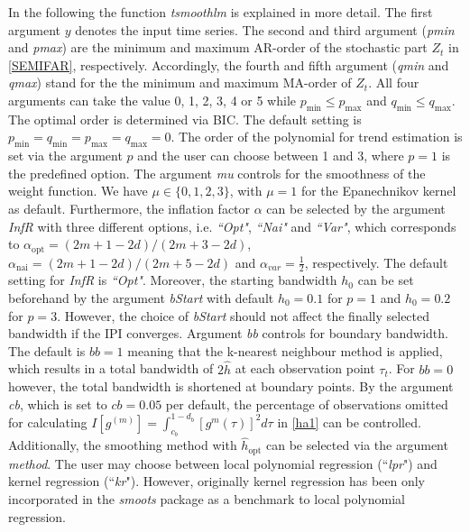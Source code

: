 \documentclass[12pt]{article}
\begin{document}
In the following the function \textit{tsmoothlm} is explained in more detail. The first argument $y$ denotes the input time series. The second and third argument (\textit{pmin} and \textit{pmax}) are the minimum and maximum AR-order of the stochastic part $Z_t$ in \eqref{SEMIFAR}, respectively. Accordingly, the fourth and fifth argument (\textit{qmin} and \textit{qmax}) stand for the the minimum and maximum MA-order of $Z_t$. All four arguments can take the value 0, 1, 2, 3, 4 or 5 while $p_{\text{min}} \leq  p_{\text{max}}$ and $q_{\text{min}} \leq  q_{\text{max}}$. The optimal order is determined via BIC. The default setting is $p_{\text{min}} = q_{\text{min}} = p_{\text{max}} = q_{\text{max}} = 0$. The order of the polynomial for trend estimation is set via the argument $p$ and the user can choose between 1 and 3, where $p = 1$ is the predefined option. The argument \textit{mu} controls for the smoothness of the weight function. We have $\mu \in \{0,1,2,3\}$, with $\mu = 1$ for the Epanechnikov kernel as default. Furthermore, the inflation factor $\alpha$ can be selected by the argument \textit{InfR} with three different options, i.e. \textit{``Opt"}, \textit{``Nai"} and \textit{``Var"}, which corresponds to $\alpha_{\text{opt}} = (2m + 1 - 2d) / (2m + 3 - 2d)$, $\alpha_{\text{nai}} = (2m + 1 - 2d) / (2m + 5 - 2d)$ and $\alpha_{var} = \frac{1}{2}$, respectively. The default setting for \textit{InfR} is \textit{``Opt"}.
Moreover, the starting bandwidth $h_0$ can be set beforehand by the argument \textit{bStart} with default $h_0 = 0.1$ for $p =1$ and $h_0 = 0.2$ for $p = 3$. However, the choice of \textit{bStart} should not affect the finally selected bandwidth if the IPI converges. Argument \textit{bb} controls for boundary bandwidth. The default is $bb = 1$ meaning that the k-nearest neighbour method is applied, which results in a total bandwidth of $2\hat{h}$ at each observation point $\tau_t$. For $\textit{bb} = 0$ however, the total bandwidth is shortened at boundary points. By the argument \textit{cb}, which is set to $\textit{cb} = 0.05$ per default, the percentage of observations omitted for calculating $I[g^{(m)}] = \int_{c_b}^{1-d_b}[g^{m}(\tau)]^2d\tau$ in \eqref{ha1} can be controlled. Additionally, the smoothing method with $\hat{h}_{\text{opt}}$ can be selected via the argument \textit{method}. The user may choose between local polynomial regression (``\textit{lpr}") and kernel regression (``\textit{kr}"). However, originally kernel regression has been only incorporated in the \textit{smoots} package as a benchmark to local polynomial regression.
\end{document}
